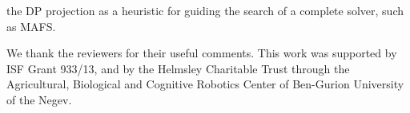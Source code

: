 \documentclass[letterpaper]{article}
\theoremstyle{definition}
\begin{document}
 the DP projection as a heuristic for guiding the search of a complete solver, such as MAFS.

 We thank the reviewers for their useful comments. This work was supported by ISF Grant 933/13, and by the Helmsley Charitable Trust through the Agricultural, Biological and Cognitive Robotics Center of Ben-Gurion University of the Negev.









\clearpage

\end{document}
